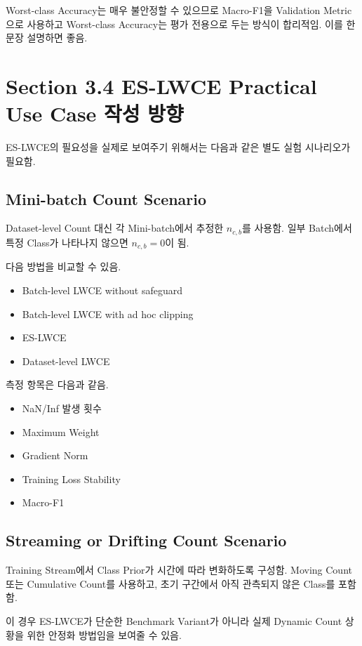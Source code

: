 \documentclass[11pt,a4paper]{article}
\begin{document}
Worst-class Accuracy는 매우 불안정할 수 있으므로 Macro-F1을 Validation Metric으로 사용하고 Worst-class Accuracy는 평가 전용으로 두는 방식이 합리적임. 이를 한 문장 설명하면 좋음.

\section{Section 3.4 ES-LWCE Practical Use Case 작성 방향}

ES-LWCE의 필요성을 실제로 보여주기 위해서는 다음과 같은 별도 실험 시나리오가 필요함.

\subsection{Mini-batch Count Scenario}

Dataset-level Count 대신 각 Mini-batch에서 추정한 \(n_{c,b}\)를 사용함. 일부 Batch에서 특정 Class가 나타나지 않으면 \(n_{c,b}=0\)이 됨.

다음 방법을 비교할 수 있음.

\begin{itemize}
\item Batch-level LWCE without safeguard
\item Batch-level LWCE with ad hoc clipping
\item ES-LWCE
\item Dataset-level LWCE
\end{itemize}

측정 항목은 다음과 같음.

\begin{itemize}
\item NaN/Inf 발생 횟수
\item Maximum Weight
\item Gradient Norm
\item Training Loss Stability
\item Macro-F1
\end{itemize}

\subsection{Streaming or Drifting Count Scenario}

Training Stream에서 Class Prior가 시간에 따라 변화하도록 구성함. Moving Count 또는 Cumulative Count를 사용하고, 초기 구간에서 아직 관측되지 않은 Class를 포함함.

이 경우 ES-LWCE가 단순한 Benchmark Variant가 아니라 실제 Dynamic Count 상황을 위한 안정화 방법임을 보여줄 수 있음.
\end{document}
